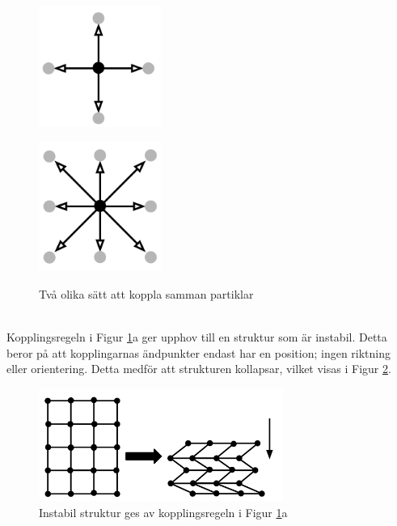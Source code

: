 \documentclass[a4paper,12pt,oneside,final,swedish]{extarticle}
\begin{document}
\begin{figure}[h]
  \begin{minipage}[h!]{.5\linewidth}
    \centering
    \includegraphics[width=4cm]{Bilder/2D_4Neighbors.png} 
    \label{fig:1a}
  \end{minipage}
  \begin{minipage}[h!]{.5\linewidth}
    \centering
    \includegraphics[width=4cm]{Bilder/2D_8Neighbors.png} 
    \label{fig:1b}
  \end{minipage}
  \caption{Två olika sätt att koppla samman partiklar}
  \label{2D_Neighbors::nonfloat}
\end{figure}

\noindent \\Kopplingsregeln i Figur \ref{2D_Neighbors::nonfloat}a ger upphov till en struktur som är instabil. Detta beror på att kopplingarnas ändpunkter endast har en position; ingen riktning eller orientering. Detta medför att strukturen kollapsar, vilket visas i Figur \ref{2D_Instabil::nonfloat}.

\begin{figure}[h!]
  \begin{center}
    \includegraphics[width=8cm]{Bilder/2D_Instabil.png} 
  \end{center}
  \caption{Instabil struktur ges av kopplingsregeln i Figur \ref{2D_Neighbors::nonfloat}a}
  \label{2D_Instabil::nonfloat}
\end{figure}
\end{document}
